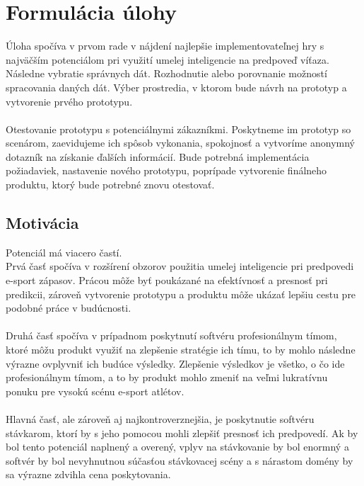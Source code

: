 \section*{Formulácia úlohy}

Úloha spočíva v prvom rade v nájdení najlepšie implementovateľnej hry s najväčším potenciálom pri využití umelej inteligencie na predpoveď víťaza. Následne vybratie správnych dát. 
Rozhodnutie alebo porovnanie možností spracovania daných dát. Výber prostredia, v ktorom bude návrh na prototyp a vytvorenie prvého prototypu. 
\\ \\
Otestovanie prototypu s potenciálnymi zákazníkmi. Poskytneme im prototyp so scenárom, zaevidujeme ich spôsob vykonania, spokojnosť a vytvoríme anonymný dotazník na získanie ďalších informácií. Bude potrebná implementácia požiadaviek, nastavenie nového prototypu, poprípade vytvorenie finálneho produktu, ktorý bude potrebné znovu otestovať. 

\subsection*{Motivácia}

Potenciál má viacero častí.\\
Prvá časť spočíva v rozšírení obzorov použitia umelej inteligencie pri predpovedi e-sport zápasov. Prácou môže byť poukázané na efektívnosť a presnosť pri predikcii, zároveň vytvorenie prototypu a produktu môže ukázať lepšiu cestu pre podobné práce v budúcnosti.
\\ \\
Druhá časť spočíva v prípadnom poskytnutí softvéru profesionálnym tímom, ktoré môžu produkt využiť na zlepšenie stratégie ich tímu, to by mohlo následne výrazne ovplyvniť ich budúce výsledky. Zlepšenie výsledkov je všetko, o čo ide profesionálnym tímom, a to by produkt mohlo zmeniť na veľmi lukratívnu ponuku pre vysokú scénu e-sport atlétov.
\\ \\
Hlavná časť, ale zároveň aj najkontroverznejšia, je poskytnutie softvéru stávkarom, ktorí by s jeho pomocou mohli zlepšiť presnosť ich predpovedí. Ak by bol tento potenciál naplnený a overený, vplyv na stávkovanie by bol enormný a softvér by bol nevyhnutnou súčasťou stávkovacej scény a s nárastom domény by sa výrazne zdvihla cena poskytovania.






